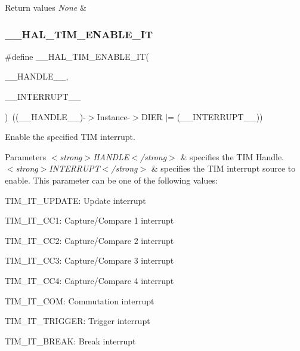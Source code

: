 \begin{DoxyRetVals}{Return values}
{\em None} & \\
\hline
\end{DoxyRetVals}
\mbox{\label{group___t_i_m___exported___macros_ga4d69943bc4716743c78e3194e259097e}} 
\subsubsection{\texorpdfstring{\_\_HAL\_TIM\_ENABLE\_IT}{\_\_HAL\_TIM\_ENABLE\_IT}}
{\footnotesize\ttfamily \#define \+\_\+\+\_\+\+H\+A\+L\+\_\+\+T\+I\+M\+\_\+\+E\+N\+A\+B\+L\+E\+\_\+\+IT(\begin{DoxyParamCaption}\item[{}]{\+\_\+\+\_\+\+H\+A\+N\+D\+L\+E\+\_\+\+\_\+,  }\item[{}]{\+\_\+\+\_\+\+I\+N\+T\+E\+R\+R\+U\+P\+T\+\_\+\+\_\+ }\end{DoxyParamCaption})~((\+\_\+\+\_\+\+H\+A\+N\+D\+L\+E\+\_\+\+\_\+)-\/$>$Instance-\/$>$D\+I\+ER $\vert$= (\+\_\+\+\_\+\+I\+N\+T\+E\+R\+R\+U\+P\+T\+\_\+\+\_\+))}



Enable the specified T\+IM interrupt. 


\begin{DoxyParams}{Parameters}
{\em $<$strong$>$\+H\+A\+N\+D\+L\+E$<$/strong$>$} & specifies the T\+IM Handle. \\
\hline
{\em $<$strong$>$\+I\+N\+T\+E\+R\+R\+U\+P\+T$<$/strong$>$} & specifies the T\+IM interrupt source to enable. This parameter can be one of the following values\+: \begin{DoxyItemize}
\item T\+I\+M\+\_\+\+I\+T\+\_\+\+U\+P\+D\+A\+TE\+: Update interrupt \item T\+I\+M\+\_\+\+I\+T\+\_\+\+C\+C1\+: Capture/\+Compare 1 interrupt \item T\+I\+M\+\_\+\+I\+T\+\_\+\+C\+C2\+: Capture/\+Compare 2 interrupt \item T\+I\+M\+\_\+\+I\+T\+\_\+\+C\+C3\+: Capture/\+Compare 3 interrupt \item T\+I\+M\+\_\+\+I\+T\+\_\+\+C\+C4\+: Capture/\+Compare 4 interrupt \item T\+I\+M\+\_\+\+I\+T\+\_\+\+C\+OM\+: Commutation interrupt \item T\+I\+M\+\_\+\+I\+T\+\_\+\+T\+R\+I\+G\+G\+ER\+: Trigger interrupt \item T\+I\+M\+\_\+\+I\+T\+\_\+\+B\+R\+E\+AK\+: Break interrupt \end{DoxyItemize}
\\
\hline
\end{DoxyParams}

